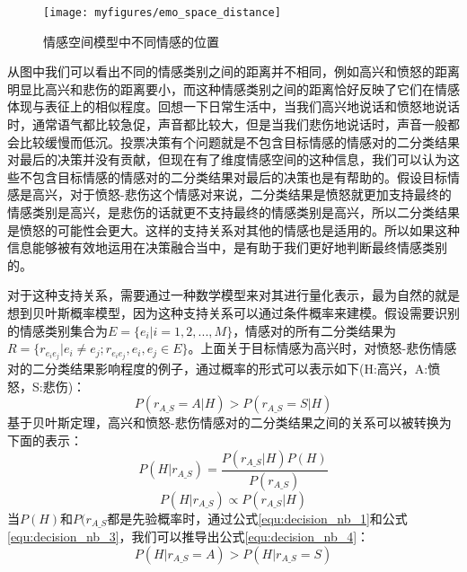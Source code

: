 \begin{figure}[htb] %
    \centering
    \texttt{[image: myfigures/emo\_space\_distance]}
    \caption{情感空间模型中不同情感的位置}
    \label{fig:emo_space_distance}
\end{figure}

从图中我们可以看出不同的情感类别之间的距离并不相同，例如高兴和愤怒的距离明显比高兴和悲伤的距离要小，而这种情感类别之间的距离恰好反映了它们在情感体现与表征上的相似程度。回想一下日常生活中，当我们高兴地说话和愤怒地说话时，通常语气都比较急促，声音都比较大，但是当我们悲伤地说话时，声音一般都会比较缓慢而低沉。投票决策有个问题就是不包含目标情感的情感对的二分类结果对最后的决策并没有贡献，但现在有了维度情感空间的这种信息，我们可以认为这些不包含目标情感的情感对的二分类结果对最后的决策也是有帮助的。假设目标情感是高兴，对于愤怒-悲伤这个情感对来说，二分类结果是愤怒就更加支持最终的情感类别是高兴，是悲伤的话就更不支持最终的情感类别是高兴，所以二分类结果是愤怒的可能性会更大。这样的支持关系对其他的情感也是适用的。所以如果这种信息能够被有效地运用在决策融合当中，是有助于我们更好地判断最终情感类别的。

对于这种支持关系，需要通过一种数学模型来对其进行量化表示，最为自然的就是想到贝叶斯概率模型，因为这种支持关系可以通过条件概率来建模。假设需要识别的情感类别集合为$E=\{e_i|i=1, 2,...,M\}$，情感对的所有二分类结果为$R = \{r_{e_ie_j}|e_i \neq e_j; r_{e_ie_j}, e_i, e_j \in E\}$。上面关于目标情感为高兴时，对愤怒-悲伤情感对的二分类结果影响程度的例子，通过概率的形式可以表示如下(H:高兴，A:愤怒，S:悲伤)：
\begin{equation}
\label{equ:decision_nb_1}
    P(r_{A\_S}=A|H) > P(r_{A\_S}=S|H)
\end{equation}
基于贝叶斯定理，高兴和愤怒-悲伤情感对的二分类结果之间的关系可以被转换为下面的表示：
\begin{equation}
\label{equ:decision_nb_2}
    P(H|r_{A\_S}) = \frac{P(r_{A\_S}|H)P(H)}{P(r_{A\_S})}
\end{equation}
\begin{equation}
\label{equ:decision_nb_3}
    P(H|r_{A\_S}) \propto P(r_{A\_S}|H)
\end{equation}
当$P(H)$和$P(r_{A\_S}$都是先验概率时，通过公式\ref{equ:decision_nb_1}和公式\ref{equ:decision_nb_3}，我们可以推导出公式\ref{equ:decision_nb_4}：
\begin{equation}
\label{equ:decision_nb_4}
    P(H|r_{A\_S}=A) > P(H|r_{A\_S}=S)
\end{equation}

